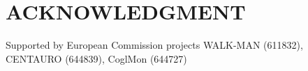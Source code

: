 \documentclass[letterpaper, 10 pt, conference]{ieeeconf}  %
\begin{document}


\section{ACKNOWLEDGMENT}
Supported by European Commission projects WALK-MAN (611832), CENTAURO (644839), CoglMon (644727)







\end{document}
